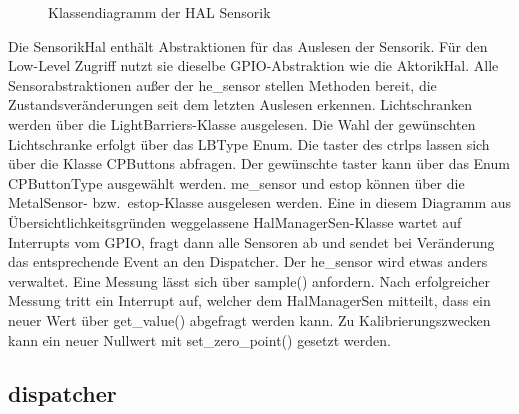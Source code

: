 \begin{figure}[h]
    \caption{Klassendiagramm der HAL Sensorik}
    \label{fig:cd-hal-sens}
\end{figure}

Die Sensorik\-Hal enthält Abstraktionen für das Auslesen der Sensorik.
Für den Low-Level Zugriff nutzt sie dieselbe GPIO-Abstraktion wie die Aktorik\-Hal.
Alle Sensorabstraktionen außer der \gls{he_sensor} stellen Methoden bereit, die Zustandsveränderungen
seit dem letzten Auslesen erkennen.
Lichtschranken werden über die LightBarriers-Klasse ausgelesen.
Die Wahl der gewünschten Lichtschranke erfolgt über das LBType Enum.
Die \gls{taster} des \gls{ctrlp}s lassen sich über die Klasse CPButtons abfragen.
Der gewünschte \gls{taster} kann über das Enum CPButtonType ausgewählt werden.
\Gls{me_sensor} und \gls{estop} können über die MetalSensor- bzw.\ \gls{estop}-Klasse ausgelesen
werden.
Eine in diesem Diagramm aus Übersichtlichkeitsgründen weggelassene HalManagerSen-Klasse wartet
auf Interrupts vom GPIO, fragt dann alle Sensoren ab und sendet bei Veränderung das entsprechende
Event an den Dispatcher.
Der \gls{he_sensor} wird etwas anders verwaltet. Eine Messung lässt sich über sample() anfordern.
Nach erfolgreicher Messung tritt ein Interrupt auf, welcher dem HalManagerSen mitteilt,
dass ein neuer Wert über get\_value() abgefragt werden kann.
Zu Kalibrierungszwecken kann ein neuer Nullwert mit set\_zero\_point() gesetzt werden.

\FloatBarrier
\subsection{dispatcher}\label{subsec:dispatcher2}

